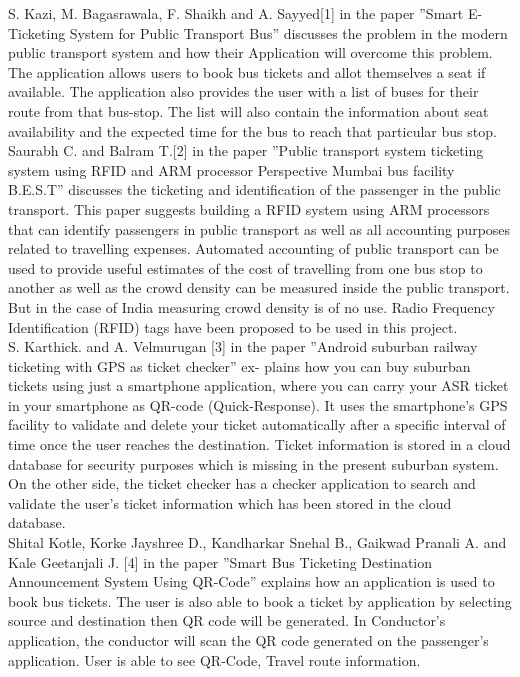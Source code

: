 S. Kazi, M. Bagasrawala, F. Shaikh and A. Sayyed[1] in the paper ”Smart E-Ticketing System for Public Transport Bus” discusses the problem in the modern public transport system and how their Application will overcome this problem. The application allows users to book bus tickets and allot themselves a seat if available. The application also provides the user with a list of buses for their route from that bus-stop. The list will also contain the information about seat availability and the expected time for the bus to reach that particular bus stop. 
\\

Saurabh C. and Balram T.[2] in the paper ”Public transport system ticketing system using RFID and ARM processor Perspective Mumbai bus facility B.E.S.T” discusses the ticketing and identification of the passenger in the public transport. This paper suggests building a RFID system using ARM processors that can identify passengers in public transport as well as all accounting purposes related to travelling expenses. Automated accounting of public transport can be used to provide useful estimates of the cost of travelling from one bus stop to another as well as the crowd density can be measured inside the public transport. But in the case of India measuring crowd density is of no use. Radio Frequency Identification (RFID) tags have been proposed to be used in this project. 
\\

S. Karthick. and A. Velmurugan [3] in the paper ”Android suburban railway ticketing with GPS as ticket checker” ex- plains how you can buy suburban tickets using just a smartphone application, where you can carry your ASR ticket in your smartphone as QR-code (Quick-Response). It uses the smartphone’s GPS facility to validate and delete your ticket automatically after a specific interval of time once the user reaches the destination. Ticket information is stored in a cloud database for security purposes which is missing in the present suburban system. On the other side, the ticket checker has a checker application to search and validate the user’s ticket information which has been stored in the cloud database.
\\

Shital Kotle, Korke Jayshree D., Kandharkar Snehal B., Gaikwad Pranali A. and Kale Geetanjali J. [4] in the paper ”Smart Bus Ticketing Destination Announcement System Using QR-Code” explains how an application is used to book bus tickets. The user is also able to book a ticket by application by selecting source and destination then QR code will be generated. In Conductor’s application, the conductor will scan the QR code generated on the passenger's application. User is able to see QR-Code, Travel route information.
